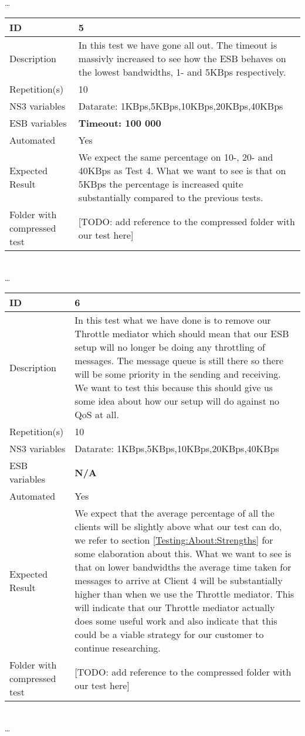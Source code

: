 \begin{center}
\\ \ldots \\

\begin{tabular}{| p{4cm} | p{8cm} |}%
	\hline
	ID & 5 \\
	\hline
	Description & In this test we have gone all out. The timeout is massivly increased to see how the ESB behaves on the lowest bandwidths, 1- and 5KBps respectively.  \\
	\hline
	Repetition(s) & 10 \\
	\hline
	NS3 variables & Datarate: 1KBps,5KBps,10KBps,20KBps,40KBps \\
	\hline
	ESB variables & \textbf{Timeout: 100 000} \\
	\hline
	Automated & Yes \\
	\hline
	Expected Result & We expect the same percentage on 10-, 20- and 40KBps as Test 4. What we want to see is that on 5KBps the percentage is increased quite substantially compared to the previous tests. \\
	\hline
	Folder with compressed test & [TODO: add reference to the compressed folder with our test here]\\
	\hline
\end{tabular}
\\ \ldots \\
\begin{tabular}{| p{4cm} | p{8cm} |}%
	\hline
	ID & 6 \\
	\hline
	Description & In this test what we have done is to remove our Throttle mediator which should mean that our ESB setup will no longer be doing any throttling of messages. The message queue is still there so there will be some priority in the sending and receiving. We want to test this because this should give us some idea about how our setup will do against no QoS at all. \\
	\hline
	Repetition(s) & 10 \\
	\hline
	NS3 variables & Datarate: 1KBps,5KBps,10KBps,20KBps,40KBps \\
	\hline
	ESB variables & \textbf{N/A} \\
	\hline
	Automated & Yes \\
	\hline
	Expected Result & We expect that the average percentage of all the clients will be slightly above what our test can do, we refer to section \ref{Testing:About:Strengths} for some elaboration about this. What we want to see is that on lower bandwidths the average time taken for messages to arrive at Client 4 will be substantially higher than when we use the Throttle mediator. This will indicate that our Throttle mediator actually does some useful work and also indicate that this could be a viable strategy for our customer to continue researching. \\
	\hline
	Folder with compressed test & [TODO: add reference to the compressed folder with our test here]\\
	\hline
\end{tabular}

\\ \ldots \\

\end{center}
